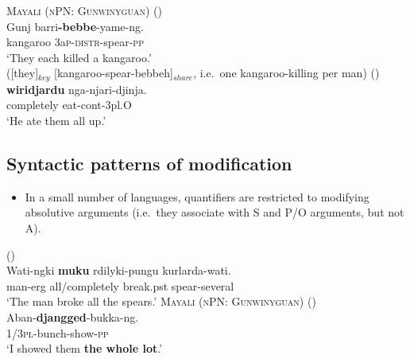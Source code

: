 \documentclass{article}
\begin{document}
\begin{exe}
  \ex \textsc{Mayali (nPN: Gunwinyguan)} (\citealt[221]{evans95})\\
  \gll Gunj barri\textbf{-bebbe}-yame-ng.\\
  kangaroo 3a\textsc{p-distr}-spear-\textsc{pp}\\
  \glt `They each killed a kangaroo.'\\
  ([they]$_{key}$ [kangaroo-spear-bebbeh]$_{share}$, i.e.\ one kangaroo-killing per man)
   (\citealt[54]{sands89})\\
  \gll \textbf{wiridjardu}  nga-njari-djinja.\\
  completely  eat-{\sc cont}-3{\sc pl.O}     \\   
  \glt `He ate them all up.'
\end{exe}


\subsection{Syntactic patterns of modification
  \label{sec:scope}}
\begin{itemize}
\item In a small number of languages, quantifiers are restricted to modifying absolutive arguments (i.e.\ they associate with S and P/O arguments, but not A). %
\end{itemize}

\begin{exe}
   (\citealt[15]{bowler17})\\
  \gll Wati-ngki \textbf{muku} rdilyki-pungu kurlarda-wati.\\
  man-{\sc erg} all/completely break.{\sc pst} spear-several\\
  \glt `The man broke all the spears.'
  \ex \textsc{Mayali (nPN: Gunwinyguan)} (\citealt[233]{evans95})\\
  \gll Aban-\textbf{djangged}-bukka-ng.\\
  1/3\textsc{pl}-bunch-show-\textsc{pp}\\
  \glt `I showed them \textbf{the whole lot}.'
\end{exe}
\end{document}
